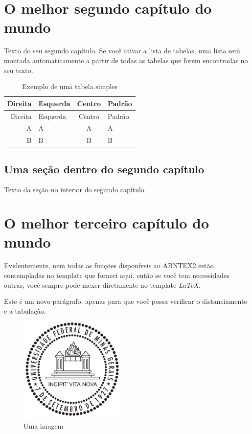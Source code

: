 \documentclass[
  12pt,
  a4paper,
  oneside,
  openright,
  sumario=abnt-6027-2012,
  english,
  brazil]{abntex2}
\begin{document}
\chapter{O melhor segundo capítulo do
mundo}\label{o-melhor-segundo-capuxedtulo-do-mundo}

Texto do seu segundo capítulo. Se você ativar a lista de tabelas, uma
lista será montada automaticamente a partir de todas as tabelas que
forem encontradas no seu texto.

\begin{longtable}[]{@{}rlcl@{}}
\caption{Exemplo de uma tabela simples}\tabularnewline
\toprule\noalign{}
Direita & Esquerda & Centro & Padrão \\
\midrule\noalign{}
\endfirsthead
\toprule\noalign{}
Direita & Esquerda & Centro & Padrão \\
\midrule\noalign{}
\endhead
\bottomrule\noalign{}
\endlastfoot
A & A & A & A \\
B & B & B & B \\
\end{longtable}

\section{Uma seção dentro do segundo
capítulo}\label{uma-seuxe7uxe3o-dentro-do-segundo-capuxedtulo}

Texto da seção no interior do segundo capítulo.

\chapter{O melhor terceiro capítulo do
mundo}\label{o-melhor-terceiro-capuxedtulo-do-mundo}

Evidentemente, nem todas as funções disponíveis ao ABNTEX2 estão
contempladas no template que forneci aqui, então se você tem
necessidades outras, você sempre pode mexer diretamente no template
\emph{LaTeX}.

Este é um novo parágrafo, apenas para que você possa verificar o
distanciamento e a tabulação.

\begin{figure}
\centering
\includegraphics[width=2.08333in,height=\textheight]{ufmg.jpg}
\caption{Uma imagem}
\end{figure}
\end{document}
